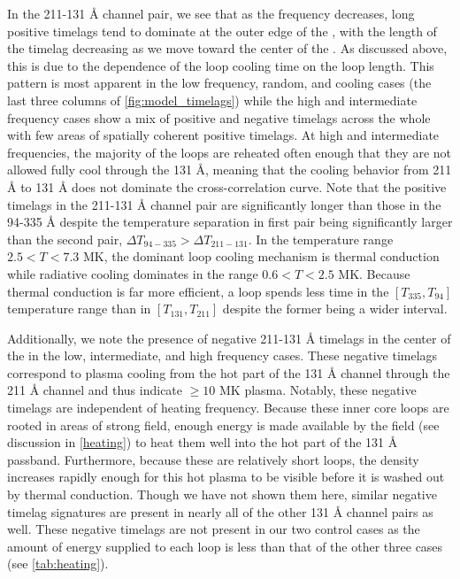 In the 211-131 \AA{} channel pair, we see that as the frequency decreases, long positive timelags tend to dominate at the outer edge of the \AR{}, with the length of the timelag decreasing as we move toward the center of the \AR{}. As discussed above, this is due to the dependence of the loop cooling time on the loop length. This pattern is most apparent in the low frequency, random, and cooling cases (the last three columns of \autoref{fig:model_timelags}) while the high and intermediate frequency cases show a mix of positive and negative timelags across the whole \AR{} with few areas of spatially coherent positive timelags. At high and intermediate frequencies, the majority of the loops are reheated often enough that they are not allowed fully cool through the 131 \AA{}, meaning that the cooling behavior from 211 \AA{} to 131 \AA{} does not dominate the cross-correlation curve. Note that the positive timelags in the 211-131 \AA{} channel pair are significantly longer than those in the 94-335 \AA{} despite the temperature separation in first pair being significantly larger than the second pair, $\Delta T_{94-335}>\Delta T_{211-131}$. In the temperature range $2.5<T<7.3$ MK, the dominant loop cooling mechanism is thermal conduction while radiative cooling dominates in the range $0.6<T<2.5$ MK. Because thermal conduction is far more efficient, a loop spends less time in the $[T_{335},T_{94}]$ temperature range than in $[T_{131},T_{211}]$ despite the former being a wider interval.

Additionally, we note the presence of negative 211-131 \AA{} timelags in the center of the \AR{} in the low, intermediate, and high frequency cases. These negative timelags correspond to plasma cooling from the hot part of the 131 \AA{} channel through the 211 \AA{} channel and thus indicate  $\ge10$ MK plasma. Notably, these negative timelags are independent of heating frequency. Because these inner core loops are rooted in areas of strong field, enough energy is made available by the field (see discussion in \autoref{heating}) to heat  them well into the hot part of the 131 \AA{} passband. Furthermore, because these are relatively short loops, the density increases rapidly enough for this hot plasma to be visible before it is washed out by thermal conduction. Though we have not shown them here, similar negative timelag signatures are present in nearly all of the other 131 \AA{} channel pairs as well. These negative timelags are not present in our two control cases as the amount of energy supplied to each loop is less than that of the other three cases (see \autoref{tab:heating}).

